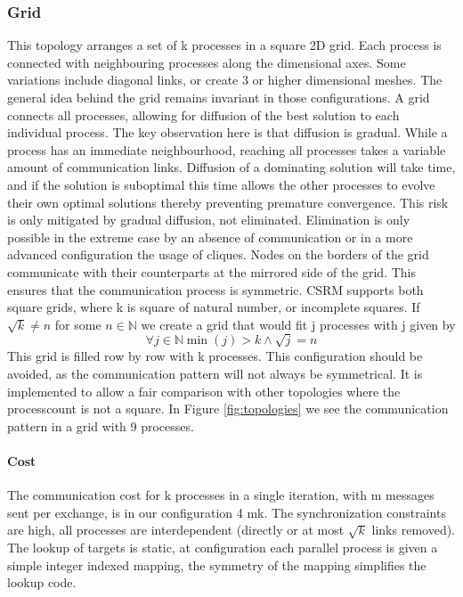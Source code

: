 \subsubsection{Grid}
This topology arranges a set of k processes in a square 2D grid. Each process is connected with neighbouring processes along the dimensional axes. Some variations include diagonal links, or create 3 or higher dimensional meshes. The general idea behind the grid remains invariant in those configurations. 
A grid connects all processes, allowing for diffusion of the best solution to each individual process. The key observation here is that diffusion is gradual. While a process has an immediate neighbourhood, reaching all processes takes a variable amount of communication links. Diffusion of a dominating solution will take time, and if the solution is suboptimal this time allows the other processes to evolve their own optimal solutions thereby preventing premature convergence. This risk is only mitigated by gradual diffusion, not eliminated. Elimination is only possible in the extreme case by an absence of communication or in a more advanced configuration the usage of cliques. 
Nodes on the borders of the grid communicate with their counterparts at the mirrored side of the grid. This ensures that the communication process is symmetric. CSRM supports both square grids, where k is square of natural number, or incomplete squares. 
If $\sqrt{k} \neq n $ for some $n \in \mathbb{N}$ we create a grid that would fit j processes with j given by 
\[\forall j \in \mathbb{N} \min(j) > k \land \sqrt{j} = n \] 
This grid is filled row by row with k processes. This configuration should be avoided, as the communication pattern will not always be symmetrical. It is implemented to allow a fair comparison with other topologies where the processcount is not a square. In Figure \ref{fig:topologies} we see the communication pattern in a grid with 9 processes.

\paragraph{Cost}
The communication cost for k processes in a single iteration, with m messages sent per exchange, is in our configuration 4 mk.
The synchronization constraints are high, all processes are interdependent (directly or at most $\sqrt{k}$ links removed).
The lookup of targets is static, at configuration each parallel process is given a simple integer indexed mapping, the symmetry of the mapping simplifies the lookup code.


